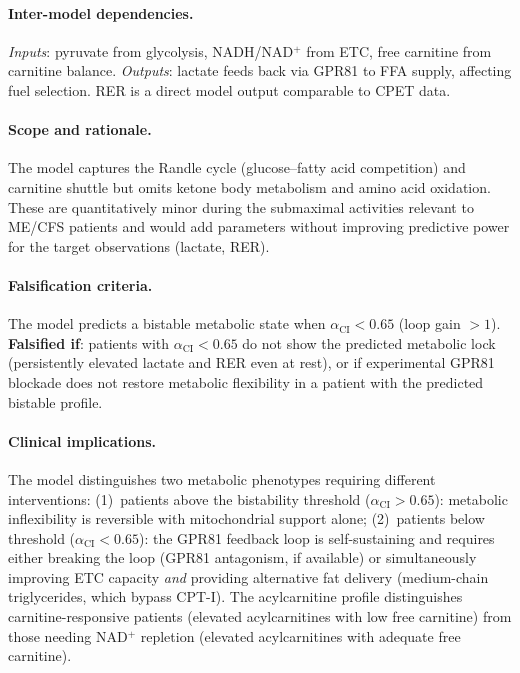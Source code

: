 \paragraph{Inter-model dependencies.}
\emph{Inputs}: pyruvate from glycolysis, NADH/NAD$^+$ from ETC, free carnitine from carnitine balance. \emph{Outputs}: lactate feeds back via GPR81 to FFA supply, affecting fuel selection. RER is a direct model output comparable to CPET data.

\paragraph{Scope and rationale.}
The model captures the Randle cycle (glucose--fatty acid competition) and carnitine shuttle but omits ketone body metabolism and amino acid oxidation. These are quantitatively minor during the submaximal activities relevant to ME/CFS patients and would add parameters without improving predictive power for the target observations (lactate, RER).

\paragraph{Falsification criteria.}
The model predicts a bistable metabolic state when $\alpha_{\text{CI}} < 0.65$ (loop gain $> 1$). \textbf{Falsified if}: patients with $\alpha_{\text{CI}} < 0.65$ do not show the predicted metabolic lock (persistently elevated lactate and RER even at rest), or if experimental GPR81 blockade does not restore metabolic flexibility in a patient with the predicted bistable profile.

\paragraph{Clinical implications.}
The model distinguishes two metabolic phenotypes requiring different interventions: (1)~patients above the bistability threshold ($\alpha_{\text{CI}} > 0.65$): metabolic inflexibility is reversible with mitochondrial support alone; (2)~patients below threshold ($\alpha_{\text{CI}} < 0.65$): the GPR81 feedback loop is self-sustaining and requires either breaking the loop (GPR81 antagonism, if available) or simultaneously improving ETC capacity \emph{and} providing alternative fat delivery (medium-chain triglycerides, which bypass CPT-I). The acylcarnitine profile distinguishes carnitine-responsive patients (elevated acylcarnitines with low free carnitine) from those needing NAD$^+$ repletion (elevated acylcarnitines with adequate free carnitine).

